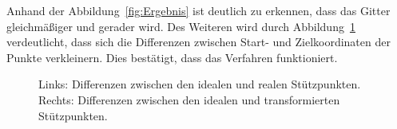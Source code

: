 Anhand der Abbildung~\ref{fig:Ergebnis} ist deutlich zu erkennen, dass das Gitter gleichmäßiger und gerader wird. Des Weiteren wird durch Abbildung~\ref{fig:diffsResult} verdeutlicht, dass sich die Differenzen zwischen Start- und Zielkoordinaten der Punkte verkleinern. Dies bestätigt, dass das Verfahren funktioniert.

\begin{figure}[H]
	\caption{Links: Differenzen zwischen den idealen und realen Stützpunkten. \\Rechts: Differenzen zwischen den idealen und transformierten Stützpunkten.}
	\label{fig:diffsResult}
\end{figure}

